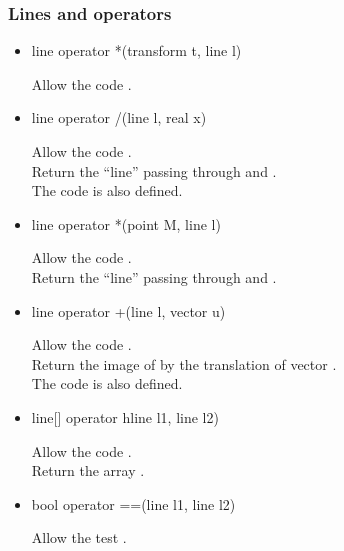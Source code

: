\documentclass[pdftex]{article}
\begin{document}
\subsubsection{Lines and operators}
\begin{itemize}
\item {}%
  \begin{Vcolor}
    line operator *(transform t, line l)
  \end{Vcolor}
  Allow the code .
\item {}%
  \begin{Vcolor}
    line operator /(line l, real x)
  \end{Vcolor}
  Allow the code  .\\
  Return the ``line'' passing through 
  and  .\\
  The code  is also defined.
\item {}%
  \begin{Vcolor}
    line operator *(point M, line l)
  \end{Vcolor}
  Allow the code  .\\
  Return the ``line'' passing through  and .
\item {}%
  \begin{Vcolor}
    line operator +(line l, vector u)
  \end{Vcolor}
  Allow the code .\\
  Return the image of  by the translation of
  vector .\\
  The code   is also defined.
\item {}%
  \begin{Vcolor}
    line[] operator ^^(line l1, line l2)
  \end{Vcolor}
  Allow the code .\\
  Return the array .
\item {}%
  \begin{Vcolor}
    bool operator ==(line l1, line l2)
  \end{Vcolor}
  Allow the test .\\

\end{itemize}
\end{document}

